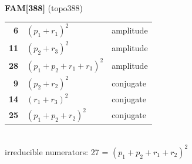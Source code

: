 \documentclass[10pt]{article}
\begin{document}
\begin{minipage}[t]{0.48\textwidth}
{}\\[2mm]\textbf{FAM[388]} (topo388)\\[2pt]{\footnotesize\begin{tabular}{@{}r@{\ \ }l@{\ \ }l@{}}\textbf{6} & $(p_1+r_1)^2$ & amplitude\\
\textbf{11} & $(p_2+r_3)^2$ & amplitude\\
\textbf{28} & $(p_1+p_2+r_1+r_3)^2$ & amplitude\\
\textbf{9} & $(p_2+r_2)^2$ & conjugate\\
\textbf{14} & $(r_1+r_3)^2$ & conjugate\\
\textbf{25} & $(p_1+p_2+r_2)^2$ & conjugate\\\end{tabular}}\\[2pt]{\scriptsize irreducible numerators: 27 = $(p_1+p_2+r_1+r_2)^2$}\end{minipage}\hfill%
\end{document}
